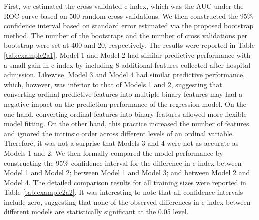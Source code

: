 \documentclass[12pt]{article}
\begin{document}
First, we estimated the cross-validated c-index, which was the AUC under the ROC curve based on 500 random cross-validations. We then constructed the 95\% confidence interval based on standard error estimated via the proposed bootstrap method. The number of the bootstraps and the number of cross validations per bootstrap were set at 400 and 20, respectively. The results were reported in Table \ref{tab:example2a1}.  Model 1 and Model 2 had similar predictive performance with a small gain in c-index by including 8 additional features collected after hospital admission. Likewise, Model 3 and Model 4 had similar predictive performance, which, however, was inferior to that of Models 1 and 2, suggesting that converting ordinal predictive features into multiple binary features may had a negative impact on the prediction performance of the regression model.  On the one hand, converting ordinal features into binary features allowed more flexible model fitting. On the other hand, this practice increased the number of features and ignored the intrinsic order across different levels of an ordinal variable. Therefore, it was not a surprise that Models 3 and 4 were not as accurate as Models 1 and 2. We then formally compared the model performance by constructing the 95\% confidence interval for the difference in c-index between Model 1 and Model 2; between Model 1 and Model 3; and between Model 2 and Model 4. The detailed comparison results for all training sizes were reported in Table \ref{tab:example2a2}. It was interesting to note that all confidence intervals include zero, suggesting that none of the observed differences in c-index between different models are statistically significant at the 0.05 level.      
\end{document}
